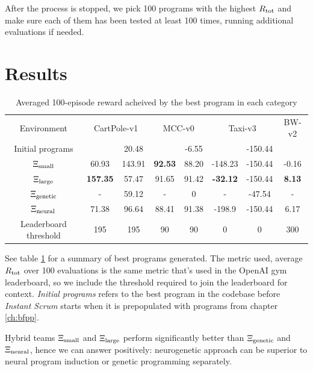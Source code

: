 After the process is stopped, we pick 100 programs with the highest $R_\text{tot}$ and make sure each of them has been tested at least 100 times, running additional evaluations if needed.

\newpage
\section{Results}
\label{sec:neurgen-results}

\begin{table}[]
    \centering
    \begin{tabular}{c|c|c|c|c|c|c|c}
         Environment & \multicolumn{2}{c}{CartPole-v1} & \multicolumn{2}{c}{MCC-v0} & \multicolumn{2}{c}{Taxi-v3} & BW-v2 \\
         Initial programs & & 20.48 & & -6.55 & & -150.44 & \\
         \midrule
         $\Xi_\text{small}$  &    60.93 &    143.91 &     \textbf{92.53} &     88.20 &   -148.23 &   -150.44 &     -0.16\\
         $\Xi_\text{large}$ & \textbf{157.35} &     57.47 &     91.65 &     91.42 &    \textbf{-32.12} &   -150.44 &      \textbf{8.13} \\ 
         $\Xi_\text{genetic}$& - & 59.12 & - & 0 & - & -47.54 & - \\ 
         $\Xi_\text{neural}$ & 71.38 & 96.64 & 88.41 & 91.38 & -198.9 & -150.44 & 6.17 \\
         \midrule
         Leaderboard threshold & 195 & 195 & 90 & 90 & 0 & 0 & 300 \\ 
    \end{tabular}
    \caption{Averaged 100-episode reward acheived by the best program in each category}
    \label{tab:neurogenetic-results}
\end{table}

See table \ref{tab:neurogenetic-results} for a summary of best programs generated.
The metric used, average $R_\text{tot}$ over 100 evaluations is the same metric that's used in the OpenAI gym leaderboard, so we include the threshold required to join the leaderboard for context.
\emph{Initial programs} refers to the best program in the codebase before \emph{Instant Scrum} starts when it is prepopulated with  programs from chapter \ref{ch:bfpp}.

Hybrid teams $\Xi_\text{small}$ and $\Xi_\text{large}$ perform significantly better than $\Xi_\text{genetic}$ and $\Xi_\text{neural}$, hence we can answer \rqneurogen positively: neurogenetic approach can be superior to neural program induction or genetic programming separately.


